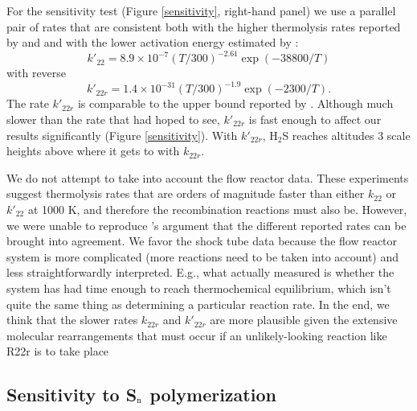 \documentclass[preprint]{aastex}
\newcounter{reaction}
\begin{document}
For the sensitivity test (Figure \ref{sensitivity}, right-hand panel) we use a parallel pair of rates that are consistent 
both with the higher thermolysis rates reported by \citet{Olschewski1994} and \citet{Woiki1994}
and with the lower activation energy estimated by \citet{Olschewski1994}:
\begin{equation}
\label{kprime22}
k'_{22} = 8.9\times 10^{-7} \left(T/300\right)^{-2.61} \exp{\left(-38800/T\right)} 
\end{equation}   
with reverse  
\begin{equation}
\label{kprime22r}
k'_{22r} = 1.4\times 10^{-31} \left(T/300\right)^{-1.9} \exp{\left(-2300/T\right)} .
\end{equation}   
The rate $k'_{22r}$ is comparable to the upper bound reported by \citet{Shiina1998}.
Although much slower than the rate that \citet{Shiina1998} had hoped to see,
$k'_{22r}$ is fast enough to affect our results significantly (Figure \ref{sensitivity}). 
With $k'_{22r}$, H$_2$S reaches altitudes 3 scale heights above where it gets to with $k_{22r}$. 

We do not attempt to take into account the flow reactor data.
These experiments suggest thermolysis rates that are orders of magnitude faster than either $k_{22}$ or $k'_{22}$ at 1000 K,
and therefore the recombination reactions must also be.
However, we were unable to reproduce \citet{Karan1999}'s argument that the different reported rates can be brought into agreement.
We favor the shock tube data because the flow reactor system is more complicated (more reactions need to be taken into account)
and less straightforwardly interpreted.
E.g., what \citet{Karan1999} actually measured is whether the system has had time enough to reach thermochemical equilibrium,
which isn't quite the same thing as determining a particular reaction rate.
In the end, we think that the slower rates $k_{22r}$ and $k'_{22r}$ are more plausible given the extensive
molecular rearrangements that must occur if an unlikely-looking reaction like R22r
is to take place


\subsection{Sensitivity to S$_{\rm n}$ polymerization}
\end{document}
